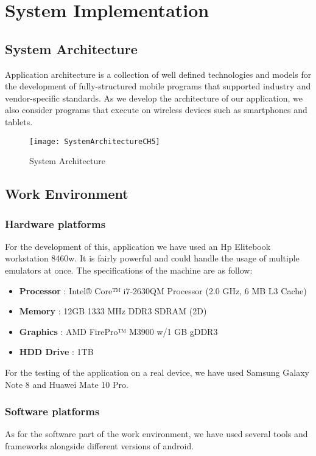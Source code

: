 \chapter{System Implementation} \label{chap:sysImplementation}

\section{System Architecture}
Application architecture is a collection of well defined technologies and models for the development of fully-structured mobile programs that supported industry and vendor-specific standards. As we develop the architecture of our application, we also consider programs that execute on wireless devices such as smartphones and tablets.

\begin{figure}[ht]
\center
\texttt{[image: SystemArchitectureCH5]}
\caption{System Architecture}
\label{fig:System Architecture}
\end{figure}

\section{Work Environment}

\subsection{Hardware platforms}
For the development of this, application we have used an Hp Elitebook workstation 8460w. It is fairly powerful and could handle the usage of multiple emulators at once. The specifications of the machine are as follow:

\begin{itemize}
\item \textbf{Processor} : Intel® Core™ i7-2630QM Processor (2.0 GHz, 6 MB L3 Cache)
\item \textbf{Memory }: 12GB 1333 MHz DDR3 SDRAM (2D)
\item \textbf{Graphics }: AMD FirePro™ M3900 w/1 GB gDDR3
\item \textbf{HDD Drive }: 1TB
\end{itemize}

For the testing of the application on a real device, we have used Samsung Galaxy Note 8 and Huawei Mate 10 Pro.

\subsection{Software platforms}
As for the software part of the work environment, we have used several tools and frameworks alongside different versions of android.


